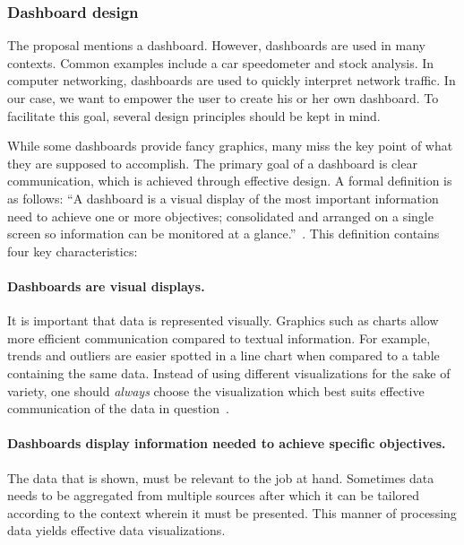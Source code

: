         \subsubsection{Dashboard design}\label{dashboards}

        The proposal mentions a dashboard. However, dashboards are used in many contexts. Common examples include a car speedometer and stock analysis. In computer networking, dashboards are used to quickly interpret network traffic. In our case, we want to empower the user to create his or her own dashboard. To facilitate this goal, several design principles should be kept in mind.
        
        While some dashboards provide fancy graphics, many miss the key point of what they are supposed to accomplish. The primary goal of a dashboard is clear communication, which is achieved through effective design. A formal definition is as follows: ``A dashboard is a visual display of the most important information need to achieve one or more objectives; consolidated and arranged on a single screen so information can be monitored at a glance.''~\cite{Few2006}. This definition contains four key characteristics:

        \paragraph{Dashboards are visual displays.} It is important that data is represented visually. Graphics such as charts allow more efficient communication compared to textual information. For example, trends and outliers are easier spotted in a line chart when compared to a table containing the same data. Instead of using different visualizations for the sake of variety, one should \emph{always} choose the visualization which best suits effective communication of the data in question~\cite{Few2005}.

        \paragraph{Dashboards display information needed to achieve specific objectives.} The data that is shown, must be relevant to the job at hand. Sometimes data needs to be aggregated from multiple sources after which it can be tailored according to the context wherein it must be presented. This manner of processing data yields effective data visualizations.

